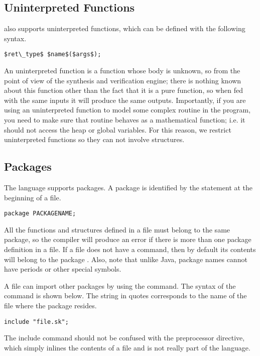 \subsection{Uninterpreted Functions}
\Sk{} also supports uninterpreted functions, which can be defined with the following syntax.
\begin{lstlisting}
$ret\_type$ $name$($args$);
\end{lstlisting}
An uninterpreted function is a function whose body is unknown, so from the point of view of the synthesis and verification engine; there is nothing known about this function other than the fact that it is a pure function, so when fed with the same inputs it will produce the same outputs. Importantly, if you are using an uninterpreted function to model some complex routine in the program, you need to make sure that routine behaves as a mathematical function; i.e. it should not access the heap or global variables. For this reason, we restrict uninterpreted functions so they can not involve structures.


\subsection{Packages}

The \Sk{} language supports packages. A package is identified by the  statement at the beginning of a file.
\begin{lstlisting}
package PACKAGENAME;
\end{lstlisting}

All the functions and structures defined in a file must belong to the same package, so the compiler will produce an error if there is more than one package definition in a file. If a file does not have a  command, then by default its contents will belong to the package . Also, note that unlike Java, package names cannot have periods or other special symbols.

A file can import other packages by using the  command. The syntax of the command is shown below. The string in quotes corresponds to the name of the file where the package resides.

\begin{lstlisting}
include "file.sk";
\end{lstlisting}

The include command should not be confused with the  preprocessor directive, which simply inlines the contents of a file and is not really part of the language.

